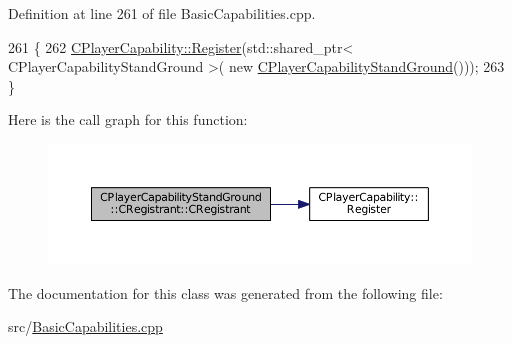 Definition at line 261 of file Basic\+Capabilities.\+cpp.


\begin{DoxyCode}
261                                                     \{
262     \hyperlink{classCPlayerCapability_a7e298018dcde2684451add3cfff065f7}{CPlayerCapability::Register}(std::shared\_ptr< CPlayerCapabilityStandGround >(\textcolor{keyword}{
      new} \hyperlink{classCPlayerCapabilityStandGround_a58f0601edbe114a45ff27b84027afd09}{CPlayerCapabilityStandGround}()));   
263 \}
\end{DoxyCode}
Here is the call graph for this function\+:\nopagebreak
\begin{figure}[H]
\begin{center}
\leavevmode
\includegraphics[width=350pt]{classCPlayerCapabilityStandGround_1_1CRegistrant_ad7c015829711721bab4ce08ef385e8ea_cgraph}
\end{center}
\end{figure}


The documentation for this class was generated from the following file\+:\begin{DoxyCompactItemize}
\item 
src/\hyperlink{BasicCapabilities_8cpp}{Basic\+Capabilities.\+cpp}\end{DoxyCompactItemize}
